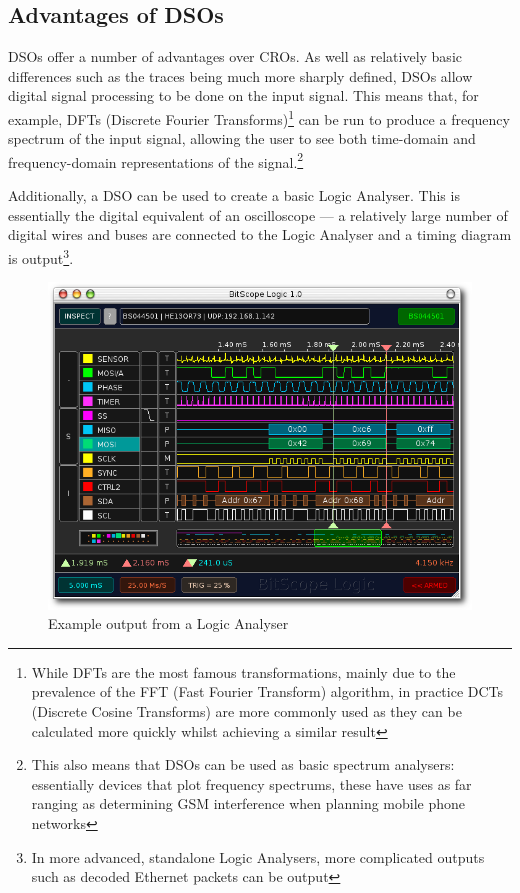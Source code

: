 \subsection*{Advantages of DSOs}

DSOs offer a number of advantages over CROs. As well as relatively basic
differences such as the traces being much more sharply defined, DSOs allow
digital signal processing to be done on the input signal. This means that, for
example, DFTs (Discrete Fourier Transforms)\footnote{While DFTs are the most
  famous transformations, mainly due to the prevalence of the FFT (Fast Fourier
  Transform) algorithm, in practice DCTs (Discrete Cosine Transforms) are more
  commonly used as they can be calculated more quickly whilst achieving a
similar result} can be run to produce a frequency spectrum of the input signal,
allowing the user to see both time-domain and frequency-domain representations
of the signal.\footnote{This also means that DSOs can be used as basic spectrum
analysers: essentially devices that plot frequency spectrums, these have uses as
far ranging as determining GSM interference when planning mobile phone networks}

Additionally, a DSO can be used to create a basic Logic Analyser. This is
essentially the digital equivalent of an oscilloscope --- a relatively large
number of digital wires and buses are connected to the Logic Analyser and a
timing diagram is output\footnote{In more advanced, standalone Logic Analysers,
more complicated outputs such as decoded Ethernet packets can be
output}.~\autocite{ElectronicDesignMSO}

\begin{figure}
  \includegraphics[width=\linewidth]{img/bitscope.png}
  \caption[Logic Analyser Example Output]{Example output from a Logic Analyser ~\autocite{Bitscope}}
\end{figure}

